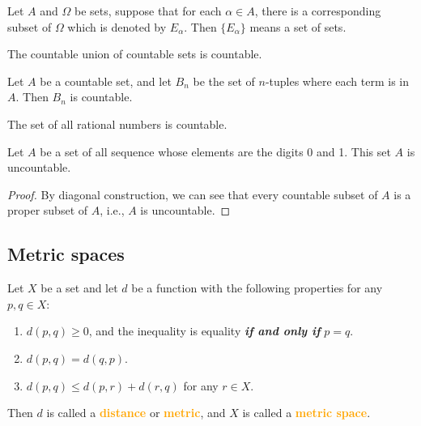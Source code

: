 \begin{remark}[pma 2.9]
Let $A$ and $\Omega$ be sets, suppose that for each $\alpha \in A$, there is a corresponding subset of $\Omega$ which is denoted by $E_\alpha$. Then $\{E_\alpha\}$ means a set of sets.
\end{remark}

\begin{theorem}[pma 2.12]
The countable union of countable sets is countable.
\end{theorem}

\begin{theorem}[pma 2.13]
Let $A$ be a countable set, and let $B_n$ be the set of $n$-tuples where each term is in $A$. Then $B_n$ is countable.
\end{theorem}

\begin{corollary}[pma 2.13]
The set of all rational numbers is countable.
\end{corollary}

\begin{theorem}[pma 2.14]
Let $A$ be a set of all sequence whose elements are the digits 0 and 1. This set $A$ is uncountable.
\end{theorem}
\begin{proof}
By diagonal construction, we can see that every countable subset of $A$ is a proper subset of $A$, i.e., $A$ is uncountable.
\end{proof}

\subsection{Metric spaces}

\begin{definition}[pma 2.15]
Let $X$ be a set and let $d$ be a function with the following properties for any $p,q\in X$:
\begin{enumerate}[label={(\arabic*)}]
\item $d(p,q) \geq 0$, and the inequality is equality \textbf{\emph{if and only if}} $p=q$.
\item $d(p,q)=d(q,p)$.
\item $d(p,q)\leq d(p,r)+d(r,q)$ for any $r\in X$.
\end{enumerate}
Then $d$ is called a \textbf{\textcolor{orange}{distance}}  or \textbf{\textcolor{orange}{metric}}, and $X$ is called a \textbf{\textcolor{orange}{metric space}}.
\end{definition}

